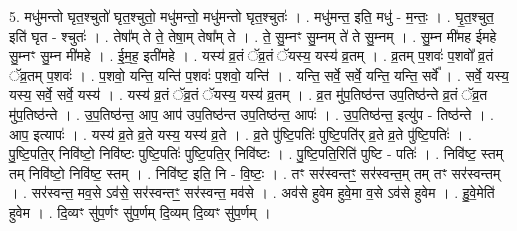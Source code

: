 \documentclass[17pt]{extarticle}
\begin{document}
5. मधु॑मन्तो घृत॒श्चुतो॑ घृत॒श्चुतो॒ मधु॑मन्तो॒ मधु॑मन्तो घृत॒श्चुतः॑ । . मधु॑मन्त॒ इति॒ मधु॑ - म॒न्तः॒ । . घृ॒त॒श्चुत॒ इति॑ घृत - श्चुतः॑ । . तेषा᳚म् ते ते॒ तेषा॒म् तेषा᳚म् ते । . ते॒ सु॒म्नꣳ सु॒म्नम् ते॑ ते सु॒म्नम् । . सु॒म्न मी॑मह ईमहे सु॒म्नꣳ सु॒म्न मी॑महे । . ई॒म॒ह॒ इती॑महे । . यस्य॑ व्र॒तं ॅव्र॒तं ॅयस्य॒ यस्य॑ व्र॒तम् । . व्र॒तम् प॒शवः॑ प॒शवो᳚ व्र॒तं ॅव्र॒तम् प॒शवः॑ । . प॒शवो॒ यन्ति॒ यन्ति॑ प॒शवः॑ प॒शवो॒ यन्ति॑ । . यन्ति॒ सर्वे॒ सर्वे॒ यन्ति॒ यन्ति॒ सर्वे᳚ । . सर्वे॒ यस्य॒ यस्य॒ सर्वे॒ सर्वे॒ यस्य॑ । . यस्य॑ व्र॒तं ॅव्र॒तं ॅयस्य॒ यस्य॑ व्र॒तम् । . व्र॒त मु॑प॒तिष्ठ॑न्त उप॒तिष्ठ॑न्ते व्र॒तं ॅव्र॒त मु॑प॒तिष्ठ॑न्ते । . उ॒प॒तिष्ठ॑न्त॒ आप॒ आप॑ उप॒तिष्ठ॑न्त उप॒तिष्ठ॑न्त॒ आपः॑ । . उ॒प॒तिष्ठ॑न्त॒ इत्यु॑प - तिष्ठ॑न्ते । . आप॒ इत्यापः॑ । . यस्य॑ व्र॒ते व्र॒ते यस्य॒ यस्य॑ व्र॒ते । . व्र॒ते पु॑ष्टि॒पतिः॑ पुष्टि॒पति॑र् व्र॒ते व्र॒ते पु॑ष्टि॒पतिः॑ । . पु॒ष्टि॒पति॒र् निवि॑ष्टो॒ निवि॑ष्टः पुष्टि॒पतिः॑ पुष्टि॒पति॒र् निवि॑ष्टः । . पु॒ष्टि॒पति॒रिति॑ पुष्टि - पतिः॑ । . निवि॑ष्ट॒ स्तम् तम् निवि॑ष्टो॒ निवि॑ष्ट॒ स्तम् । . निवि॑ष्ट॒ इति॒ नि - वि॒ष्टः॒ । . तꣳ सर॑स्वन्तꣳ॒॒ सर॑स्वन्त॒म् तम् तꣳ सर॑स्वन्तम् । . सर॑स्वन्त॒ मव॒से ऽव॑से॒ सर॑स्वन्तꣳ॒॒ सर॑स्वन्त॒ मव॑से । . अव॑से हुवेम हुवे॒मा व॒से ऽव॑से हुवेम । . हु॒वे॒मेति॑ हुवेम । . दि॒व्यꣳ सु॑प॒र्णꣳ सु॑प॒र्णम् दि॒व्यम् दि॒व्यꣳ सु॑प॒र्णम् । \newline
\end{document}

